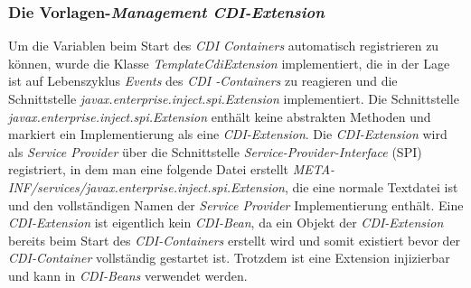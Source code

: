 \subsubsection{Die Vorlagen-\emph{Management CDI-Extension}}
Um die Variablen beim Start des \emph{CDI Containers} automatisch registrieren zu können, wurde die Klasse \emph{TemplateCdiExtension} implementiert, die in der Lage ist auf Lebenszyklus \emph{Events} des \emph{CDI -Containers} zu reagieren und die Schnittstelle \emph{javax.enterprise.inject.spi.Extension} implementiert. Die Schnittstelle \emph{javax.enterprise.inject.spi.Extension} enthält keine abstrakten Methoden und markiert ein Implementierung als eine \emph{CDI-Extension}. Die \emph{CDI-Extension} wird als \emph{Service Provider} über die Schnittstelle \emph{Service-Provider-Interface} (SPI) registriert, in dem man eine folgende Datei erstellt \emph{META-INF/services/javax.enterprise.inject.spi.Extension}, die eine normale Textdatei ist und den vollständigen Namen der \emph{Service Provider} Implementierung enthält. 
\newline
\newline
Eine \emph{CDI-Extension} ist eigentlich kein \emph{CDI-Bean}, da ein Objekt der \emph{CDI-Extension} bereits beim Start des \emph{CDI-Containers} erstellt wird und somit existiert bevor der \emph{CDI-Container} vollständig gestartet ist. Trotzdem ist eine Extension injizierbar und kann in \emph{CDI-Beans} verwendet werden.
 







